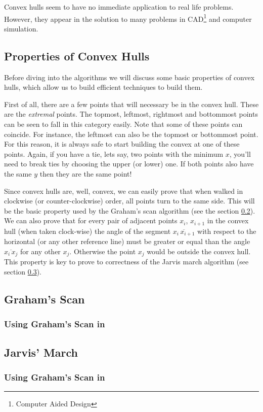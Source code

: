 Convex hulls seem to have no immediate application to real life problems.
However, they appear in the solution to many problems in 
CAD\footnote{Computer Aided Design} and computer simulation.

\subsection{Properties of Convex Hulls}\label{sub:convex-hull-properties}

Before diving into the algorithms we will discuss some basic 
properties of convex hulls, which allow us to build efficient
techniques to build them. 

First of all, there are a few points that will necessary be in the
convex hull. These are the \emph{extremal} points. The topmost,
leftmost, rightmost and bottommost points can be seen to fall
in this category easily. Note that some of these points can coincide.
For instance, the leftmost can also be the topmost or bottommost point.
For this reason, it is always safe to start building the convex at
one of these points. Again, if you have a tie, lets say, two points
with the minimum $x$, you'll need to break ties by choosing the 
upper (or lower) one. If both points also have the same $y$ then
they are the same point!

Since convex hulls are, well, convex, we can easily prove that
when walked in clockwise (or counter-clockwise) order, all points
turn to the same side. This will be the basic property used
by the Graham's scan algorithm (see the section \ref{sub:graham-scan}).
We can also prove that for every pair of adjacent points $x_i$, $x_{i+1}$ in the convex
hull (when taken clock-wise) the angle of the segment $\overline{x_i\,x_{i+1}}$
with respect to the horizontal (or any other reference line)
must be greater or equal than the angle
$\overline{x_i\,x_j}$ for any other $x_j$.
Otherwise the point $x_j$ would be outside the convex hull. This
property is key to prove to correctness of the Jarvis march algorithm
(see section \ref{sub:jarvis-march}).

\subsection{Graham's Scan}\label{sub:graham-scan}

\subsubsection*{Using Graham's Scan in \sct}\label{algorithm:graham-scan}

\subsection{Jarvis' March}\label{sub:jarvis-march}

\subsubsection*{Using Graham's Scan in \sct}\label{algorithm:graham-scan}